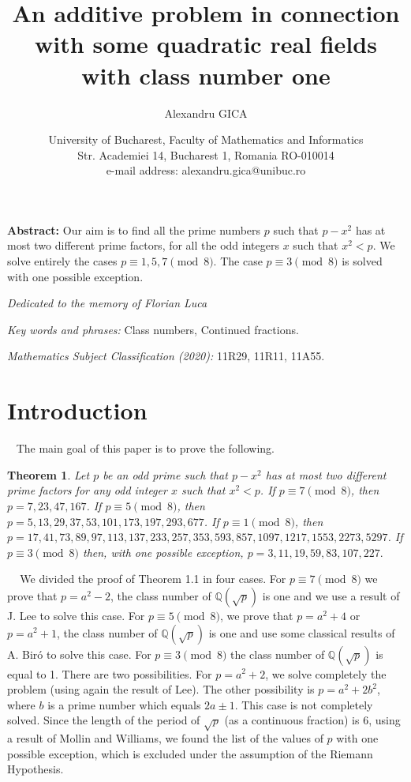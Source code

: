 \documentclass[12pt]{article}
\newtheorem{theorem}[definition]{Theorem}
{\theorembodyfont{\rmfamily}\newtheorem{example}[definition]{Example}}
{\theorembodyfont{\rmfamily}\newtheorem{examples}[definition]{Examples}}
{\theorembodyfont{\rmfamily}\newtheorem{observation}[definition]{Observation}}
\begin{document}
\title{An additive problem in connection with some quadratic real fields with class number one}

\author { Alexandru GICA}
\date{University of Bucharest, Faculty of Mathematics and Informatics\\Str. Academiei 14, Bucharest 1, Romania RO-010014\\ e-mail address: alexandru.gica@unibuc.ro}

\maketitle \small{ {\bf Abstract:}  
Our aim is to find all the prime numbers $p$ such that $p-x^2$ has at most two different prime factors, for all the odd integers $x$ such that $x^2< p$. We solve entirely the cases $p\equiv 1,5,7 \pmod 8$.  The case $p\equiv 3 \pmod 8$ is solved with one possible exception.


\textit{Dedicated to the memory of Florian Luca}

\textit{Key words and phrases:} Class numbers, Continued fractions.


\textit{Mathematics Subject Classification (2020):} 11R29, 11R11, 11A55.


\section{Introduction} 
$\;\;\;$The main goal of this paper is to prove the following.
\begin{theorem}
Let $p$ be an odd prime such that $p-x^2$ has at most two different prime factors for any odd integer $x$ such that $x^2< p$. If $p\equiv 7 \pmod 8$, then $p=7,23,47,167$. If $p\equiv 5 \pmod 8$, then $p=5,13,29,37,53,101,173,197,293,677$. If $p\equiv 1 \pmod 8$, then $p=17,41,73,89,97,113,137,233,257,353,593,857,1097,1217,1553,2273,5297$.  If $p\equiv 3 \pmod 8$ then, with one possible exception, $p=3,11,19,59,83,107,227.$ 
\end{theorem}

$\;\;\;$ We divided the proof of Theorem 1.1 in four cases. For $p\equiv 7 \pmod 8$ we prove that $p=a^2-2$, the class number of $\mathbb{Q}(\sqrt {p})$ is one and we use a result of J. Lee to solve this case. For $p\equiv 5 \pmod 8$, we prove that $p=a^2+4$ or $p=a^2+1$, the class number of $\mathbb{Q}(\sqrt {p})$  is one and use some classical results of A. Bir\'{o}  to solve this case. For $p\equiv 3 \pmod 8$  the class number of $\mathbb{Q}(\sqrt {p})$ is equal to 1. There are two possibilities. For $p=a^2+2$, we solve completely the problem (using again the result of Lee). The other possibility is $p=a^2+2b^2$, where $b$ is a prime number which equals $2a\pm 1$. This case is not completely solved. Since the length of the period of $\sqrt p$ (as a continuous fraction) is 6, using a result of Mollin and Williams, we found the list of the values of $p$ with one possible exception, which is excluded under the assumption of the Riemann Hypothesis. 

}
\end{document}
